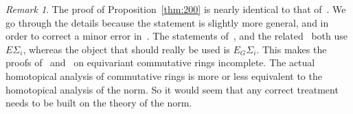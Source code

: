 \documentclass{amsart}
\newtheorem{rem}[equation]{Remark}
\theoremstyle{definition}
\theoremstyle{remark}
\newtheorem{rem}[equation]{Remark}
\newcommand{\eggroup}[2]{E_{#1}#2}
\begin{document}
\begin{rem}
\label{rem:53} The proof of Proposition~\ref{thm:200} is nearly
identical to that of~\cite[Lemma III.8.4]{MR1922205}.  We go through
the details because the statement is slightly more general, and in
order to correct a minor error in~\cite{MR1922205}.  The statements
of~\cite[Lemma III.8.4]{MR1922205}, and the related~\cite[Lemma
IV.4.5]{MR1922205} both use $E\Sigma_{i}$, whereas the object that
should really be used is $\eggroup{G}{\Sigma_{i}}$.  This makes the
proofs of~\cite[Theorem III.8.1]{MR1922205} and~\cite[Theorem
4]{MR2066508} on equivariant commutative rings incomplete.  The actual
homotopical analysis of commutative rings is more or less equivalent
to the homotopical analysis of the norm.  So it would seem that any
correct treatment needs to be built on the theory of the norm.
\end{rem}
\end{document}
